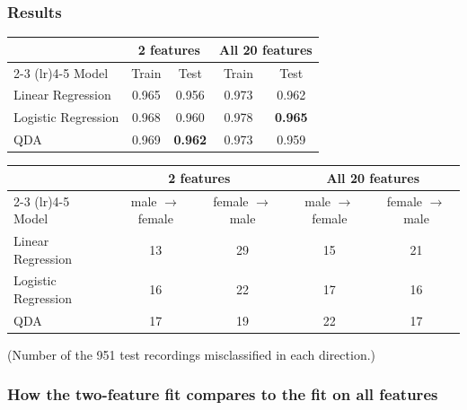 \documentclass[11pt]{article}
\begin{document}
\subsubsection*{Results}

\begin{center}
\begin{tabular}{lcccc}
\toprule
 & \multicolumn{2}{c}{2 features} & \multicolumn{2}{c}{All 20 features} \\
\cmidrule(lr){2-3} \cmidrule(lr){4-5}
Model & Train & Test & Train & Test \\
\midrule
Linear Regression   & 0.965 & 0.956 & 0.973 & 0.962 \\
Logistic Regression & 0.968 & 0.960 & 0.978 & \textbf{0.965} \\
QDA                 & 0.969 & \textbf{0.962} & 0.973 & 0.959 \\
\bottomrule
\end{tabular}
\end{center}

\begin{center}
\begin{tabular}{lcccc}
\toprule
 & \multicolumn{2}{c}{2 features} & \multicolumn{2}{c}{All 20 features} \\
\cmidrule(lr){2-3} \cmidrule(lr){4-5}
Model & male $\to$ female & female $\to$ male & male $\to$ female & female $\to$ male \\
\midrule
Linear Regression   & 13 & 29 & 15 & 21 \\
Logistic Regression & 16 & 22 & 17 & 16 \\
QDA                 & 17 & 19 & 22 & 17 \\
\bottomrule
\end{tabular}
\end{center}
\noindent (Number of the 951 test recordings misclassified in each direction.)

\subsubsection*{How the two-feature fit compares to the fit on all features}
\end{document}
